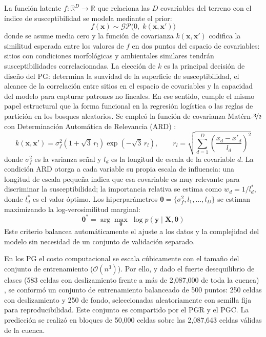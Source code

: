 \documentclass[12pt, a4paper]{article}
\begin{document}
La función latente $f:\mathbb{R}^D\!\to\mathbb{R}$ que relaciona las $D$ covariables del terreno con el
índice de susceptibilidad se modela mediante el prior:
\begin{equation}
    f(\mathbf{x}) \sim \mathcal{GP}\!\bigl(0,\; k(\mathbf{x},\mathbf{x}')\bigr)
    \label{eq:gp_prior}
\end{equation}
donde se asume media cero y la función de covarianza $k(\mathbf{x},\mathbf{x}')$ codifica la similitud esperada entre
los valores de $f$ en dos puntos del espacio de covariables: sitios con condiciones morfológicas y ambientales
similares tendrán susceptibilidades correlacionadas. La elección de $k$ es la principal decisión de diseño del PG: 
determina la suavidad de la superficie de susceptibilidad, el alcance de la correlación
entre sitios en el espacio de covariables y la capacidad del modelo para capturar patrones no lineales.
En ese sentido, cumple el mismo papel estructural que la forma funcional en la regresión logística
o las reglas de partición en los bosques aleatorios.
Se empleó la función de covarianza Matérn-$\nicefrac{3}{2}$ con
Determinación Automática de Relevancia (ARD) \citep{Matern1960, Rasmussen2006}:
\begin{equation}
    k(\mathbf{x},\mathbf{x}') = \sigma_f^2\!\left(1 + \sqrt{3}\,r_l\right)\exp\!\left(-\sqrt{3}\,r_l\right),
    \qquad
    r_l = \sqrt{\sum_{d=1}^{D}\!\left(\frac{x_d - x'_d}{l_d}\right)^{\!2}}
    \label{eq:matern}
\end{equation}
donde $\sigma_f^2$ es la varianza señal y $l_d$ es la longitud de escala de la covariable $d$. La condición
ARD otorga a cada variable su propia escala de influencia: una longitud de escala pequeña indica que esa
covariable es muy relevante para discriminar la susceptibilidad; la importancia relativa se estima como
$w_d = 1/l_d^*$, donde $l_d^*$ es el valor óptimo. Los hiperparámetros
$\boldsymbol{\theta}=\{\sigma_f^2, l_1,\ldots,l_D\}$ se estiman maximizando la log-verosimilitud marginal:
\begin{equation}
    \boldsymbol{\theta}^* = \arg\max_{\boldsymbol{\theta}}\;\log p\!\left(\mathbf{y}\mid\mathbf{X},\boldsymbol{\theta}\right)
    \label{eq:mle}
\end{equation}
Este criterio balancea automáticamente el ajuste a los datos y la complejidad del modelo sin necesidad de un
conjunto de validación separado.

En los PG el costo computacional se escala cúbicamente con el tamaño del conjunto de entrenamiento ($\mathcal{O}(n^3)$).
Por ello, y dado el fuerte desequilibrio de clases (583 celdas con deslizamiento frente a más de
2{,}087{,}000 de toda la cuenca) \citep{Chawla2002, Heckmann2014}, se conformó un conjunto de entrenamiento
balanceado de 500 puntos: 250 celdas con deslizamiento y 250 de fondo, seleccionadas aleatoriamente
con semilla fija para reproducibilidad. Este conjunto es compartido por el PGR y el PGC. La predicción
se realizó en bloques de 50{,}000 celdas sobre las 2{,}087{,}643 celdas válidas de la cuenca.
\end{document}
